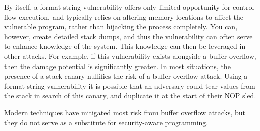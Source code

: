 By itself, a format string vulnerability offers only limited opportunity for control flow execution, and typically
relies on altering memory locations to affect the vulnerable program, rather than hijacking the process completely. You
can, however, create detailed stack dumps, and thus the vulnerability can often serve to enhance knowledge of the
system. This knowledge can then be leveraged in other attacks. For example, if this vulnerability exists alongside a
buffer overflow, then the damage potential is significantly greater. In most situations, the presence of a stack canary
nullifies the risk of a buffer overflow attack. Using a format string vulnerability it is possible that an adversary
could tear values from the stack in search of this canary, and duplicate it at the start of their NOP sled.

Modern techniques have mitigated most risk from buffer overflow attacks, but they do not serve as a substitute for
security-aware programming.
